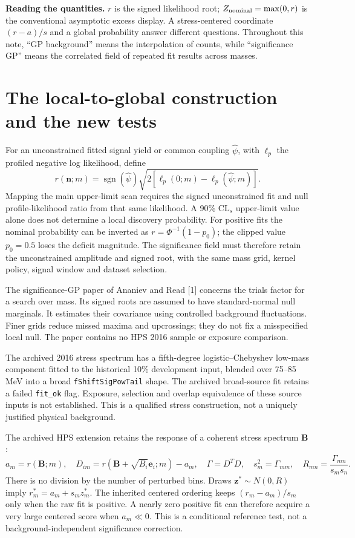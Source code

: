 \documentclass[11pt]{article}
\newcommand{\pageheading}[1]{\section*{\color{navy}#1}}
\begin{document}
\textbf{Reading the quantities.} $r$ is the signed likelihood root; $Z_{\rm nominal}=\max(0,r)$ is the conventional asymptotic excess display. A stress-centered coordinate $(r-a)/s$ and a global probability answer different questions. Throughout this note, ``GP background'' means the interpolation of counts, while ``significance GP'' means the correlated field of repeated fit results across masses.

\clearpage
\pageheading{The local-to-global construction and the new tests}
For an unconstrained fitted signal yield or common coupling $\widehat\psi$, with $\ell_p$ the profiled negative log likelihood, define
\[
r(\mathbf n;m)=\operatorname{sgn}(\widehat\psi)
\sqrt{2[\ell_p(0;m)-\ell_p(\widehat\psi;m)]}.
\]
Mapping the main upper-limit scan requires the signed unconstrained fit and null profile-likelihood ratio from that same likelihood. A 90\% $\mathrm{CL}_s$ upper-limit value alone does not determine a local discovery probability. For positive fits the nominal probability can be inverted as $r=\Phi^{-1}(1-p_0)$; the clipped value $p_0=0.5$ loses the deficit magnitude. The significance field must therefore retain the unconstrained amplitude and signed root, with the same mass grid, kernel policy, signal window and dataset selection.

The significance-GP paper of Ananiev and Read [1] concerns the trials factor for a search over mass. Its signed roots are assumed to have standard-normal null marginals. It estimates their covariance using controlled background fluctuations. Finer grids reduce missed maxima and upcrossings; they do not fix a misspecified local null. The paper contains no HPS 2016 sample or exposure comparison.

The archived 2016 stress spectrum has a fifth-degree logistic--Chebyshev low-mass component fitted to the historical 10\% development input, blended over 75--85 MeV into a broad \texttt{fShiftSigPowTail} shape. The archived broad-source fit retains a failed \texttt{fit\_ok} flag. Exposure, selection and overlap equivalence of these source inputs is not established. This is a qualified stress construction, not a uniquely justified physical background.

The archived HPS extension retains the response of a coherent stress spectrum $\mathbf B$:
\[
a_m=r(\mathbf B;m),\quad
D_{im}=r(\mathbf B+\sqrt{B_i}\mathbf e_i;m)-a_m,\quad
\Gamma=D^TD,\quad s_m^2=\Gamma_{mm},\quad R_{mn}=\frac{\Gamma_{mn}}{s_ms_n}.
\]
There is no division by the number of perturbed bins. Draws $\mathbf z^*\sim N(0,R)$ imply $r_m^*=a_m+s_mz_m^*$. The inherited centered ordering keeps $(r_m-a_m)/s_m$ only when the raw fit is positive. A nearly zero positive fit can therefore acquire a very large centered score when $a_m\ll0$. This is a conditional reference test, not a background-independent significance correction.
\end{document}
